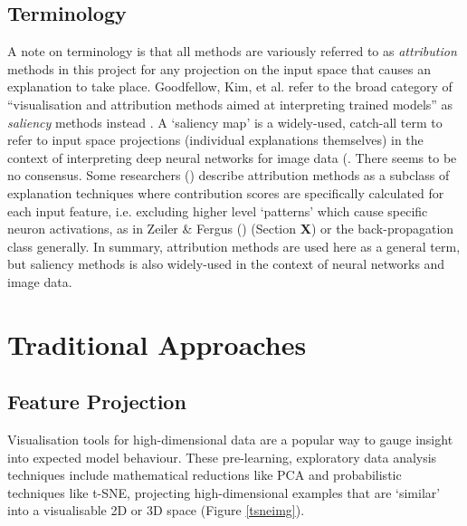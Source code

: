 \documentclass[main]{subfiles}
\begin{document}
\subsection*{Terminology}
A note on terminology is that all methods are variously referred to as \textit{attribution} methods in this project for any projection on the input space that causes an explanation to take place. Goodfellow, Kim, et al. refer to the broad category of ``visualisation and attribution methods aimed at interpreting trained models'' as \textit{saliency} methods instead \cite{sanity}. A `saliency map' is a widely-used, catch-all term to refer to input space projections (individual explanations themselves) in the context of interpreting deep neural networks for image data (\cite{sanity}. There seems to be no consensus. Some researchers (\cite{patternnet}) describe attribution methods as a subclass of explanation techniques where contribution scores are specifically calculated for each input feature, i.e. excluding higher level `patterns' which cause specific neuron activations, as in Zeiler \& Fergus (\cite{zeilerfergus2013}) (Section \textbf{X}) or the back-propagation class generally. In summary, attribution methods are used here as a general term, but saliency methods is also widely-used in the context of neural networks and image data.

\section{Traditional Approaches}

\subsection{Feature Projection}
Visualisation tools for high-dimensional data are a popular way to gauge insight into expected model behaviour.  These pre-learning, exploratory data analysis techniques include mathematical reductions like PCA and probabilistic techniques like t-SNE,  projecting high-dimensional examples that are `similar' into a visualisable 2D or 3D space \cite{tsnepaper} (Figure \ref{tsneimg}).
\end{document}

